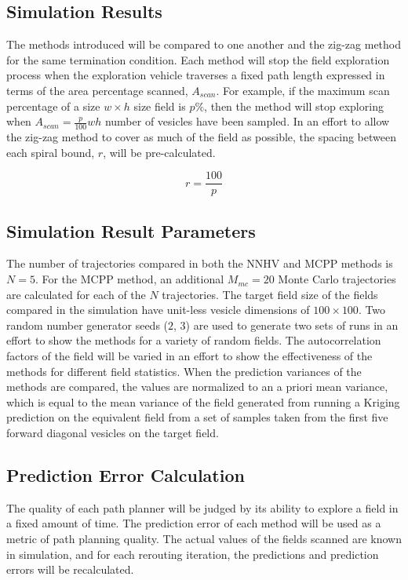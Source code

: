 \subsection{Simulation Results}
The methods introduced will be compared to one another and the zig-zag method for the same termination condition. Each method will stop the field exploration process when the exploration vehicle traverses a fixed path length expressed in terms of the area percentage scanned, $A_{scan}$. For example, if the maximum scan percentage of a size $w \times h$ size field is $p\%$, then the method will stop exploring when $A_{scan} = \frac{p}{100}wh$ number of vesicles have been sampled. In an effort to allow the zig-zag method to cover as much of the field as possible, the spacing between each spiral bound, $r$, will be pre-calculated.

\begin{equation}
    r = \frac{100}{p}
\end{equation}

\subsection{Simulation Result Parameters}
The number of trajectories compared in both the NNHV and MCPP methods is $N=5$. For the MCPP method, an additional $M_{mc}=20$ Monte Carlo trajectories are calculated for each of the $N$ trajectories. The target field size of the fields compared in the simulation have unit-less vesicle dimensions of $100\times 100$. Two random number generator seeds ($2$, $3$) are used to generate two sets of runs in an effort to show the methods for a variety of random fields. The autocorrelation factors of the field will be varied in an effort to show the effectiveness of the methods for different field statistics. When the prediction variances of the methods are compared, the values are normalized to an a priori mean variance, which is equal to the mean variance of the field generated from running a Kriging prediction on the equivalent field from a set of samples taken from the first five forward diagonal vesicles on the target field.

\subsection{Prediction Error Calculation}
The quality of each path planner will be judged by its ability to explore a field in a fixed amount of time. The prediction error of each method will be used as a metric of path planning quality. The actual values of the fields scanned are known in simulation, and for each rerouting iteration, the predictions and prediction errors will be recalculated.

